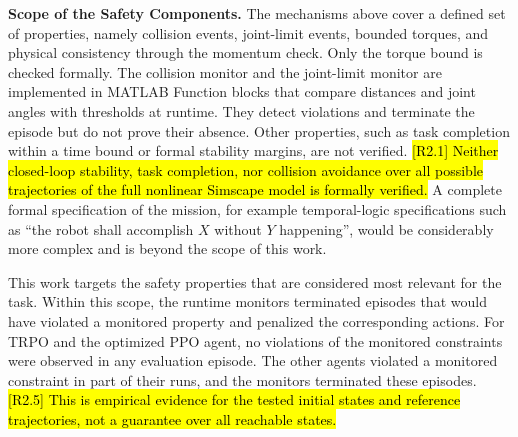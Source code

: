 \documentclass{ieeeaccess}
\newcommand{\hlone}[1]{{\sethlcolor{rone}\hl{#1}}}
\begin{document}
\textbf{Scope of the Safety Components.} The mechanisms above cover a defined set of
properties, namely collision events, joint-limit events, bounded torques, and physical consistency
through the momentum check. Only the torque bound is checked formally. The collision
monitor and the joint-limit monitor are implemented in MATLAB Function blocks that compare distances and
joint angles with thresholds at runtime. They detect violations and terminate the episode but do not
prove their absence. Other properties, such as task completion within a time bound or formal stability
margins, are not verified. \hlone{[R2.1] Neither closed-loop stability, task completion, nor collision
avoidance over all possible trajectories of the full nonlinear Simscape model is formally verified.} A
complete formal specification of the mission, for example temporal-logic specifications such as ``the
robot shall accomplish $X$ without $Y$ happening'', would be considerably more complex and is beyond the
scope of this work.

This work targets the safety properties that are considered most relevant for the task. Within this
scope, the runtime monitors terminated episodes that would have violated a monitored property and
penalized the corresponding actions. For TRPO and the optimized PPO agent, no violations of
the monitored constraints were observed in any evaluation episode. The other
agents violated a monitored constraint in part of their runs, and the monitors terminated these
episodes. \hlone{[R2.5] This is empirical evidence for the tested initial states and reference
trajectories, not a guarantee over all reachable states.}
\end{document}
